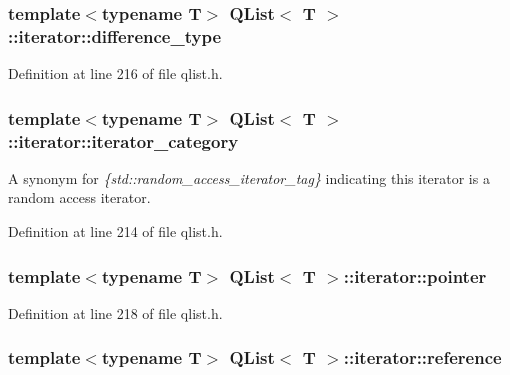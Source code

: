 \subsubsection[{\texorpdfstring{difference\+\_\+type}{difference_type}}]{\setlength{\rightskip}{0pt plus 5cm}template$<$typename T$>$ {\bf Q\+List}$<$ T $>$\+::{\bf iterator\+::difference\+\_\+type}}\hypertarget{class_q_list_1_1iterator_a6360336f54f546a21d69e233f8334fc5}{}\label{class_q_list_1_1iterator_a6360336f54f546a21d69e233f8334fc5}


Definition at line 216 of file qlist.\+h.

\subsubsection[{\texorpdfstring{iterator\+\_\+category}{iterator_category}}]{\setlength{\rightskip}{0pt plus 5cm}template$<$typename T$>$ {\bf Q\+List}$<$ T $>$\+::{\bf iterator\+::iterator\+\_\+category}}\hypertarget{class_q_list_1_1iterator_aef6f10c045692f5c9f82a9a629e76a82}{}\label{class_q_list_1_1iterator_aef6f10c045692f5c9f82a9a629e76a82}
A synonym for {\itshape \{std\+::random\+\_\+access\+\_\+iterator\+\_\+tag\}} indicating this iterator is a random access iterator. 

Definition at line 214 of file qlist.\+h.

\subsubsection[{\texorpdfstring{pointer}{pointer}}]{\setlength{\rightskip}{0pt plus 5cm}template$<$typename T$>$ {\bf Q\+List}$<$ T $>$\+::{\bf iterator\+::pointer}}\hypertarget{class_q_list_1_1iterator_a07f26136c3c7f042cce2f522ecf15f17}{}\label{class_q_list_1_1iterator_a07f26136c3c7f042cce2f522ecf15f17}


Definition at line 218 of file qlist.\+h.

\subsubsection[{\texorpdfstring{reference}{reference}}]{\setlength{\rightskip}{0pt plus 5cm}template$<$typename T$>$ {\bf Q\+List}$<$ T $>$\+::{\bf iterator\+::reference}}\hypertarget{class_q_list_1_1iterator_aadf226cf04225b39acd26973c72681bc}{}\label{class_q_list_1_1iterator_aadf226cf04225b39acd26973c72681bc}


